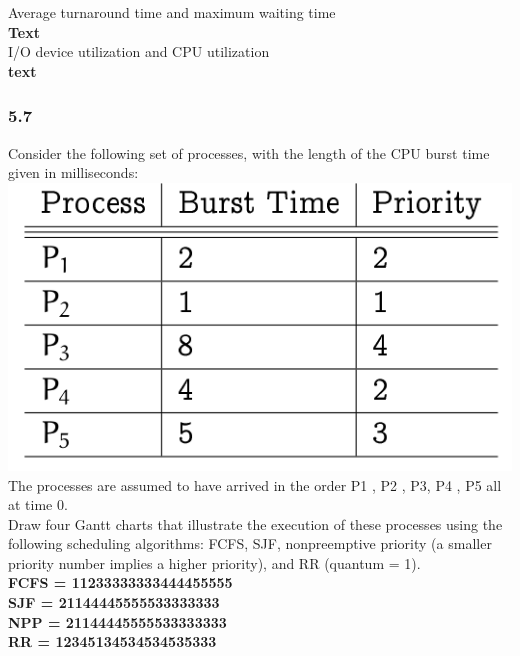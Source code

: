\documentclass[a4paper,10pt,titlepage]{report}
\begin{document}
\hspace{10mm}Average turnaround time and maximum waiting time\\
\hspace{20mm} \textbf{
Text
} \\
\hspace{10mm}I/O device utilization and CPU utilization\\
\hspace{20mm} \textbf{
text
} \\


\subsubsection{5.7}
Consider the following set of processes, with the length of the CPU burst time given in milliseconds: \\

\includegraphics[scale=0.5]{ex-5_7.png} \\

The processes are assumed to have arrived in the order P1 , P2 , P3, P4 , P5 all at time 0.\\
\hspace{10mm}Draw four Gantt charts that illustrate the execution of these processes using the following scheduling algorithms: FCFS, SJF, nonpreemptive priority (a smaller priority number implies a higher priority), and RR (quantum = 1).
\textbf{ \\
\hspace{20mm} FCFS = 11233333333444455555 \\
\hspace{20mm} SJF \hspace{2mm} = 21144445555533333333 \\
\hspace{20mm} NPP \hspace{0.25mm} = 21144445555533333333\\
\hspace{20mm} RR \hspace{2.75mm} = 12345134534534535333 
}
\end{document}
